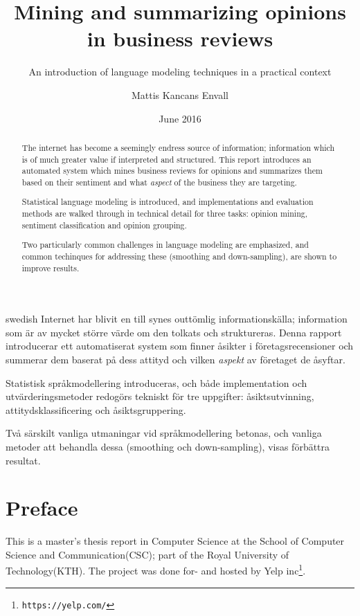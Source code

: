 \documentclass[a4paper,11pt]{kth-mag}
\title{Mining and summarizing opinions in business reviews}
\subtitle{An introduction of language modeling techniques in a practical context}
\author{Mattis Kancans Envall}
\date{June 2016}
\begin{document}
\frontmatter
\pagestyle{empty}
\removepagenumbers
\maketitle
{}
\begin{abstract}
  The internet has become a seemingly endress source of information;
  information which is of much greater value if interpreted and structured.
  This report introduces an automated system which mines business reviews for opinions and summarizes them
  based on their sentiment and what \emph{aspect} of the business they are targeting.
  
  Statistical language modeling is introduced, and implementations and evaluation
  methods are walked through in technical detail for three tasks: opinion mining, sentiment classification
  and opinion grouping.

  Two particularly common challenges in language modeling are emphasized, and common techinques for addressing these
  (smoothing and down-sampling), are shown to improve results.
\end{abstract}


\clearpage
\begin{foreignabstract}{swedish}
  Internet har blivit en till synes outtömlig informationskälla; information som är av mycket större
  värde om den tolkats och struktureras.
  Denna rapport introducerar ett automatiserat system som finner åsikter i företagsrecensioner och summerar dem
  baserat på dess attityd och vilken \emph{aspekt} av företaget de åsyftar.

  Statistisk språkmodellering introduceras, och både implementation och utvärderingsmetoder redogörs tekniskt
  för tre uppgifter: åsiktsutvinning, attitydsklassificering och åsiktsgruppering.

  Två särskilt vanliga utmaningar vid språkmodellering betonas, och vanliga metoder att behandla dessa (smoothing och down-sampling), visas förbättra resultat.
\end{foreignabstract}
\clearpage

\section*{Preface}
This is a master's thesis report in Computer Science at the School of Computer Science and Communication(CSC); part of the Royal University of Technology(KTH). The project was done for- and hosted by Yelp inc\footnote{\texttt{https://yelp.com/}}.
\end{document}
